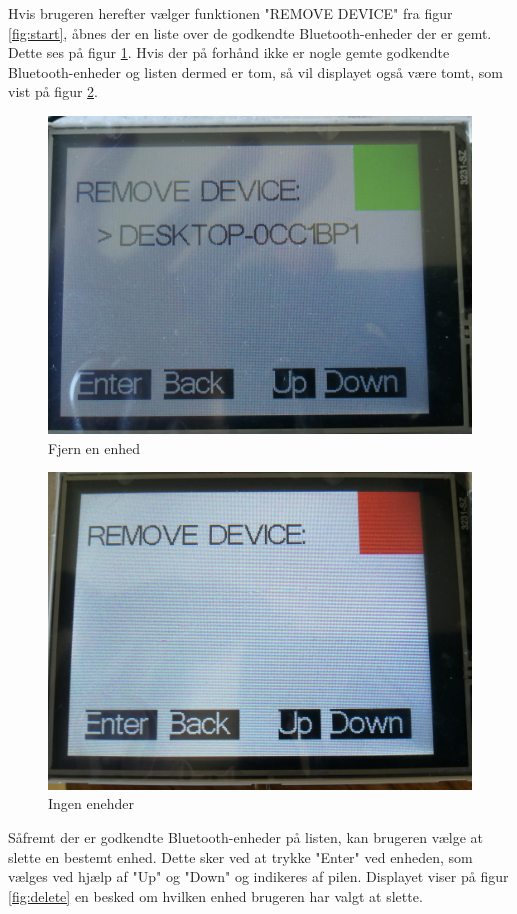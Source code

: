 Hvis brugeren herefter vælger funktionen "REMOVE DEVICE" fra figur \ref{fig:start}, åbnes der en liste over de godkendte Bluetooth-enheder der er gemt. Dette ses på figur \ref{fig:remove}. Hvis der på forhånd ikke er nogle gemte godkendte Bluetooth-enheder og listen dermed er tom, så vil displayet også være tomt, som vist på figur \ref{fig:noDevices}. 
\begin{figure}[H]
	\centering
	\includegraphics[width = 300 pt]{Img/remove.jpg}
	\caption{Fjern en enhed}
	\label{fig:remove}
\end{figure}
\begin{figure}[H]
	\centering
	\includegraphics[width = 300 pt]{Img/noDevice.jpg}
	\caption{Ingen enehder}
	\label{fig:noDevices}
\end{figure}
Såfremt der er godkendte Bluetooth-enheder på listen, kan brugeren vælge at slette en bestemt enhed. Dette sker ved at trykke "Enter" ved enheden, som vælges ved hjælp af "Up" og "Down" og indikeres af pilen. Displayet viser på figur \ref{fig:delete} en besked om hvilken enhed brugeren har valgt at slette. 
